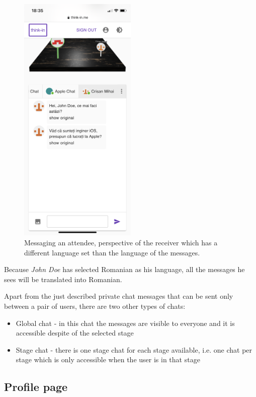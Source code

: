 \begin{figure}[H]
	\centering
	\includegraphics[width=0.5\textwidth,keepaspectratio]{images/business_logic/main_page_signed_in_chat_translated.png}
	\caption{Messaging an attendee, perspective of the receiver which has a different language set than the language of the messages.}
	\label{figure:website-attendee-messaging-receiver}
\end{figure}

Because \textit{John Doe} has selected Romanian as his language, all the messages he sees will be translated into Romanian.

Apart from the just described private chat messages that can be sent only between a pair of users, there are two other types of chats: 
\begin{itemize}
	\item Global chat - in this chat the messages are visible to everyone and it is accessible despite of the selected stage
	\item Stage chat - there is one stage chat for each stage available, i.e. one chat per stage which is only accessible when the user is in that stage
\end{itemize}

\subsection{Profile page}

